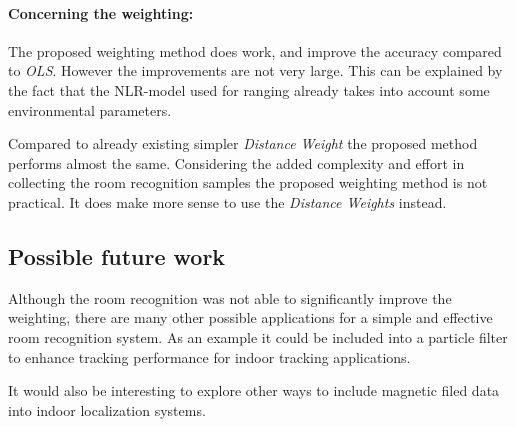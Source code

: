 \paragraph{Concerning the weighting:} 

The proposed weighting method does work, and improve the accuracy compared to \emph{OLS}. However the improvements are not very large. This can be explained by the fact that the NLR-model used for ranging already takes into account some environmental parameters.

Compared to already existing simpler \emph{Distance Weight} the proposed method performs almost the same. Considering the added complexity and effort in collecting the room recognition samples the proposed weighting method is not practical. It does make more sense to use the \emph{Distance Weights} instead.



\subsection{Possible future work}

Although the room recognition was not able to significantly improve the weighting, there are many other possible applications for a simple and effective room recognition system. As an example it could be included into a particle filter to enhance tracking performance for indoor tracking applications.

It would also be interesting to explore other ways to include magnetic filed data into indoor localization systems.